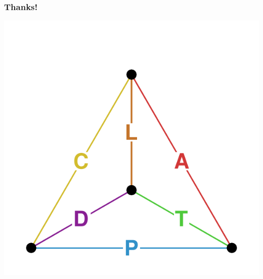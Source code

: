 \documentclass[20pt]{beamer}
\begin{document}
\begin{frame}
\frametitle{Thanks!}
\vspace{-4em}
\begin{center}
\includegraphics[scale=1.7]{Figures/TetraHedronEdgesOnly.pdf}
\end{center}
\end{frame}


\end{document}
